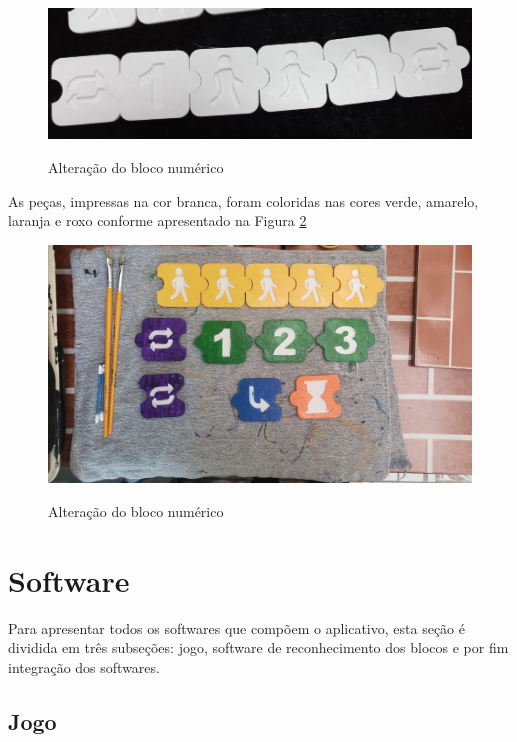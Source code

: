     \begin{figure}[H]
        \caption{Alteração do bloco numérico}
        \centering
        \includegraphics[width=\linewidth]{Imagens/Cap4/alteracao_bloco_numerico.jpg}
        \label{figura:alteracao_bloco_numerico}
    \end{figure}
    
    As peças, impressas na cor branca, foram coloridas nas cores verde, amarelo, laranja e roxo conforme apresentado na Figura \ref{figura:blocos_pintados}
    
    \begin{figure}[H]
        \caption{Alteração do bloco numérico}
        \centering
        \includegraphics[width=\linewidth]{Imagens/Cap4/blocos_pintados.jpeg}
        \label{figura:blocos_pintados}
    \end{figure}

\section{Software}

Para apresentar todos os softwares que compõem o aplicativo, esta seção é dividida em três subseções: jogo, software de reconhecimento dos blocos e por fim integração dos softwares.

    \subsection{Jogo}
    
